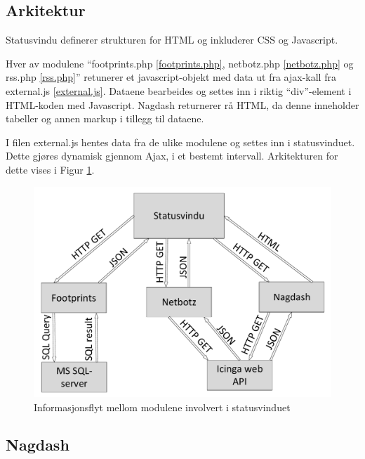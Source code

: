 \subsection{Arkitektur}

Statusvindu definerer strukturen for HTML og inkluderer CSS og Javascript.

Hver av modulene ``footprints.php \ref{footprints.php}, netbotz.php \ref{netbotz.php} og rss.php \ref{rss.php}'' retunerer et javascript-objekt med data ut fra ajax-kall fra external.js \ref{external.js}. Dataene bearbeides og settes inn i riktig ``div''-element i HTML-koden med Javascript. Nagdash returnerer rå HTML, da denne inneholder tabeller og annen markup i tillegg til dataene.

I filen external.js hentes data fra de ulike modulene og settes inn i statusvinduet. Dette gjøres dynamisk gjennom Ajax, i et bestemt intervall. Arkitekturen for dette vises i Figur \ref{statusvindu_arkitektur}.

\begin{figure}[H]
    \centering
    \includegraphics[scale=0.4]{img/statusvindu_arkitektur}
    \caption{Informasjonsflyt mellom modulene involvert i statusvinduet}
    \label{statusvindu_arkitektur}
\end{figure}


\subsection{Nagdash}

